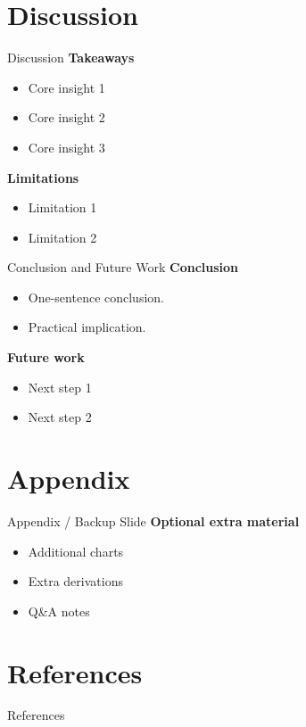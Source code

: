 \documentclass[aspectratio=169]{beamer}
\begin{document}
\section{Discussion}

\begin{frame}{Discussion}
\textbf{Takeaways}
\begin{itemize}
  \item Core insight 1
  \item Core insight 2
  \item Core insight 3
\end{itemize}

\vspace{0.5em}
\textbf{Limitations}
\begin{itemize}
  \item Limitation 1
  \item Limitation 2
\end{itemize}
\end{frame}

\begin{frame}{Conclusion and Future Work}
\textbf{Conclusion}
\begin{itemize}
  \item One-sentence conclusion.
  \item Practical implication.
\end{itemize}

\vspace{0.4em}
\textbf{Future work}
\begin{itemize}
  \item Next step 1
  \item Next step 2
\end{itemize}
\end{frame}

\section*{Appendix}

\begin{frame}{Appendix / Backup Slide}
\textbf{Optional extra material}
\begin{itemize}
  \item Additional charts
  \item Extra derivations
  \item Q\&A notes
\end{itemize}
\end{frame}

\section*{References}

\begin{frame}[allowframebreaks]{References}
\printbibliography[heading=none]
\end{frame}
\end{document}
